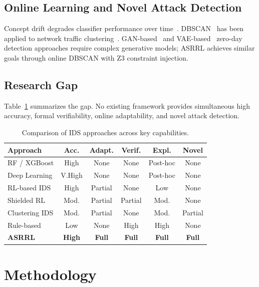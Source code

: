 \documentclass[conference]{IEEEtran}
\newcommand{\ASRRL}{\textsc{ASRRL}}
\begin{document}
\subsection{Online Learning and Novel Attack Detection}

Concept drift degrades classifier performance over time~\cite{jordaney2017, barbero2022}. DBSCAN~\cite{ester1996} has been applied to network traffic clustering~\cite{leung2005}. GAN-based~\cite{wang2020} and VAE-based~\cite{zhao2021} zero-day detection approaches require complex generative models; \ASRRL{} achieves similar goals through online DBSCAN with Z3 constraint injection.

\subsection{Research Gap}

Table~\ref{tab:lit_comparison} summarizes the gap. No existing framework provides simultaneous high accuracy, formal verifiability, online adaptability, and novel attack detection.

\begin{table}[htbp]
\centering
\caption{Comparison of IDS approaches across key capabilities.}
\label{tab:lit_comparison}
\footnotesize
\begin{tabular}{lccccc}
\toprule
\textbf{Approach} & \textbf{Acc.} & \textbf{Adapt.} & \textbf{Verif.} & \textbf{Expl.} & \textbf{Novel} \\
\midrule
RF / XGBoost & High & None & None & Post-hoc & None \\
Deep Learning & V.High & None & None & Post-hoc & None \\
RL-based IDS & High & Partial & None & Low & None \\
Shielded RL & Mod. & Partial & Partial & Mod. & None \\
Clustering IDS & Mod. & Partial & None & Mod. & Partial \\
Rule-based & Low & None & High & High & None \\
\midrule
\textbf{ASRRL} & \textbf{High} & \textbf{Full} & \textbf{Full} & \textbf{Full} & \textbf{Full} \\
\bottomrule
\end{tabular}
\end{table}


\section{Methodology}
\label{sec:methodology}
\end{document}
